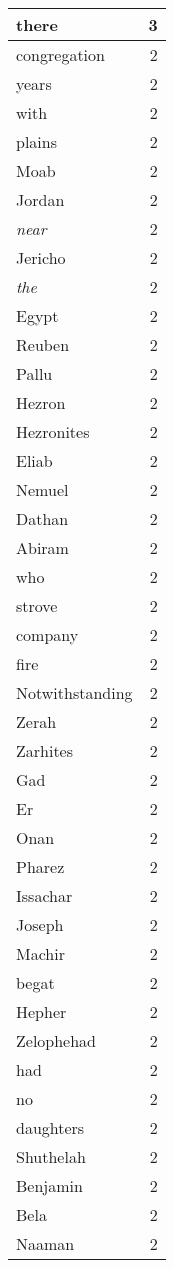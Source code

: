 \begin{center}
\begin{longtable}{l|r}
there & 3\\ \hline 
congregation & 2\\ \hline 
years & 2\\ \hline 
with & 2\\ \hline 
plains & 2\\ \hline 
Moab & 2\\ \hline 
Jordan & 2\\ \hline 
\emph{near} & 2\\ \hline 
Jericho & 2\\ \hline 
\emph{the} & 2\\ \hline 
Egypt & 2\\ \hline 
Reuben & 2\\ \hline 
Pallu & 2\\ \hline 
Hezron & 2\\ \hline 
Hezronites & 2\\ \hline 
Eliab & 2\\ \hline 
Nemuel & 2\\ \hline 
Dathan & 2\\ \hline 
Abiram & 2\\ \hline 
who & 2\\ \hline 
strove & 2\\ \hline 
company & 2\\ \hline 
fire & 2\\ \hline 
Notwithstanding & 2\\ \hline 
Zerah & 2\\ \hline 
Zarhites & 2\\ \hline 
Gad & 2\\ \hline 
Er & 2\\ \hline 
Onan & 2\\ \hline 
Pharez & 2\\ \hline 
Issachar & 2\\ \hline 
Joseph & 2\\ \hline 
Machir & 2\\ \hline 
begat & 2\\ \hline 
Hepher & 2\\ \hline 
Zelophehad & 2\\ \hline 
had & 2\\ \hline 
no & 2\\ \hline 
daughters & 2\\ \hline 
Shuthelah & 2\\ \hline 
Benjamin & 2\\ \hline 
Bela & 2\\ \hline 
Naaman & 2\\ \hline 

\end{longtable}
\end{center}
